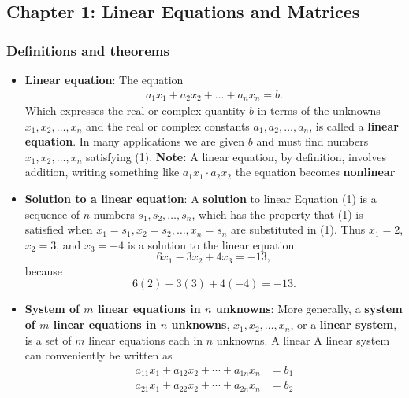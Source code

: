 \documentclass{report}
\begin{document}
    \subsection{Chapter 1: Linear Equations and Matrices}
    \bigbreak \noindent 
    \subsubsection{Definitions and theorems}
    \begin{itemize}
        \item \textbf{Linear equation}: The equation
            \begin{align*}
                a_{1}x_{1} + a_{2}x_{2} + ... + a_{n}x_{n} = b  \tag{1}
            .\end{align*}
            Which expresses the real or complex quantity \(b\) in terms of the unknowns \(x_1, x_2, \ldots, x_n\) and the real or complex constants \(a_1, a_2, \ldots, a_n\), is called a \textbf{linear equation}. In many applications we are given \(b\) and must find numbers \(x_1, x_2, \ldots, x_n\) satisfying (1).
            \bigbreak \noindent 
            \textbf{Note:} A linear equation, by definition, involves addition, writing something like $a_{1}x_{1} \cdot  a_{2}x_{2} $ the equation becomes \textbf{nonlinear}
        \item \textbf{Solution to a linear equation}:
            A \textbf{solution} to linear Equation (1) is a sequence of \(n\) numbers \(s_1, s_2, \ldots, s_n\), which has the property that (1) is satisfied when \(x_1 = s_1, x_2 = s_2, \ldots, x_n = s_n\) are substituted in (1). Thus \(x_1 = 2\), \(x_2 = 3\), and \(x_3 = -4\) is a solution to the linear equation
            \[
                6x_1 - 3x_2 + 4x_3 = -13,
            \]
            because
            \[
                6(2) - 3(3) + 4(-4) = -13.
            \]
        \item \textbf{System of $m$ linear equations in $n$ unknowns}:
            More generally, a \textbf{system of \(m\) linear equations in \(n\) unknowns}, \(x_1, x_2, \ldots, x_n\), or a \textbf{linear system}, is a set of \(m\) linear equations each in \(n\) unknowns. A linear
            \bigbreak \noindent 
            A linear system can conveniently be written as
            \[
                \begin{aligned}
                    a_{11}x_1 + a_{12}x_2 + \cdots + a_{1n}x_n &= b_1 \\
                    a_{21}x_1 + a_{22}x_2 + \cdots + a_{2n}x_n &= b_2 \\

\end{aligned}\]
\end{itemize}
\end{document}
